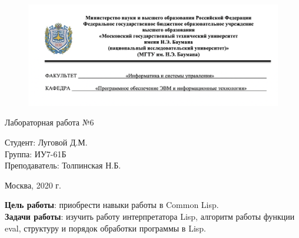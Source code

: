 


	
\begin{figure}[h!]
	\begin{center}
		{\includegraphics[width = \textwidth]{titul.png}}
	\end{center}
\end{figure}

\vspace*{20mm}

\huge
\begin{center}
	Лабораторная работа №6
\end{center}


\vspace*{50mm}

\large
\begin{flushleft}
	Студент: Луговой Д.М. \\
	Группа: ИУ7-61Б \\
	Преподаватель: Толпинская Н.Б.
\end{flushleft}

\vspace*{60mm}

\large
\begin{center}
	Москва, 2020 г.
\end{center}

\thispagestyle{empty}

\newpage
\vspace*{10mm}
\textbf{Цель работы}: приобрести навыки работы в Common Lisp.\\

\textbf{Задачи работы}: изучить работу интерпретатора Lisp, алгоритм работы функции eval, структуру и порядок обработки программы в Lisp.

